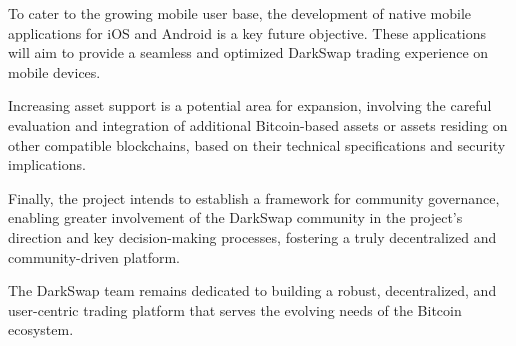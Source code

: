 \documentclass{article}
\begin{document}
To cater to the growing mobile user base, the development of native mobile applications for iOS and Android is a key future objective. These applications will aim to provide a seamless and optimized DarkSwap trading experience on mobile devices.

Increasing asset support is a potential area for expansion, involving the careful evaluation and integration of additional Bitcoin-based assets or assets residing on other compatible blockchains, based on their technical specifications and security implications.

Finally, the project intends to establish a framework for community governance, enabling greater involvement of the DarkSwap community in the project's direction and key decision-making processes, fostering a truly decentralized and community-driven platform.

The DarkSwap team remains dedicated to building a robust, decentralized, and user-centric trading platform that serves the evolving needs of the Bitcoin ecosystem.
\end{document}
